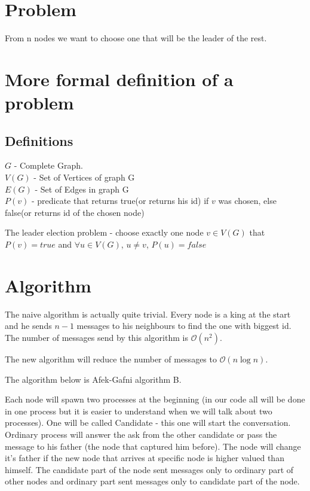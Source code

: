 \documentclass{article}
\begin{document}
\section*{Problem}
From n nodes we want to choose one that will be the leader of the rest.

\section*{More formal definition of a problem}
\subsection*{Definitions}

    \(G\) - Complete Graph.\\
\(V(G)\) - Set of Vertices of graph G\\
\(E(G)\) - Set of Edges in graph G\\
\(P(v)\) - predicate that returns true(or returns his id) if \(v\) was chosen, else false(or returns id of the chosen node)

The leader election problem - choose exactly one node \(v \in V(G)\) that \(P(v) = true\) and \(\forall u \in V(G)\), \( u \ne v\), \(P(u) = false\) 

\section*{Algorithm}
The naive algorithm is actually quite trivial. Every node is a king at the start and he sends \(n - 1\) messages to his neighbours to find the one with biggest id. The number of messages send by this algorithm is \(\mathcal{O}(n^2)\).

The new algorithm will reduce the number of messages to \(\mathcal{O}(n \log n)\).

The algorithm below is Afek-Gafni algorithm B.

Each node will spawn two processes at the beginning (in our code all will be done in one process but it is easier to understand when we will talk about two processes). One will be called Candidate - this one will start the conversation. Ordinary process will answer the ask from the other candidate or pass the message to his father (the node that captured him before). The node will change it's father if the new node that arrives at specific node is higher valued than himself. The candidate part of the node sent messages only to ordinary part of other nodes and ordinary part sent messages only to candidate part of the node.
\end{document}
